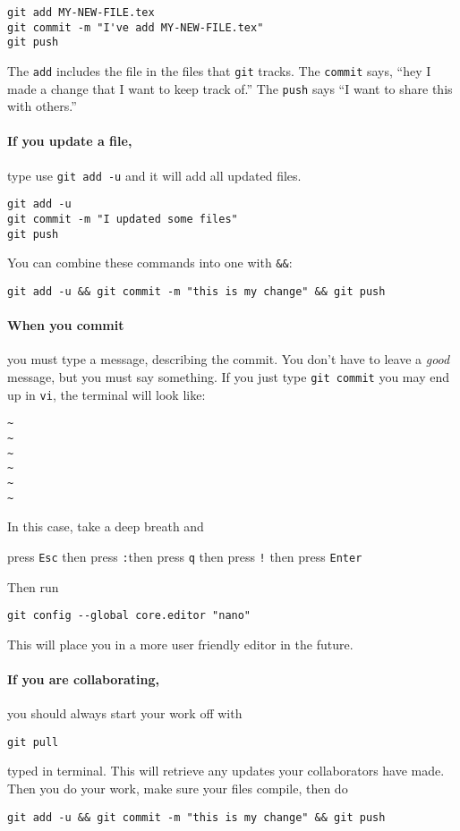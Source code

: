 \documentclass{ximera}
\begin{document}
\begin{verbatim}
git add MY-NEW-FILE.tex
git commit -m "I've add MY-NEW-FILE.tex"
git push
\end{verbatim}
The \verb!add! includes the file in the files that \verb!git! tracks. The
\verb!commit! says, ``hey I made a change that I want to keep track of.'' The
\verb!push! says ``I want to share this with others.''

\paragraph{If you update a file,}
type use \verb!git add -u! and it will add all updated files.
\begin{verbatim}
git add -u
git commit -m "I updated some files"
git push
\end{verbatim}
You can combine these commands into one with \verb!&&!:
\begin{verbatim}
git add -u && git commit -m "this is my change" && git push
\end{verbatim}

\paragraph{When you commit} you must type a message, describing the commit. You
don't have to leave a \textit{good} message, but you must say something.
If you just type \verb!git commit! you may end up in \verb!vi!, the terminal
will look like:
\begin{verbatim}
~
~
~
~
~
~
\end{verbatim}
In this case, take a deep breath and
\begin{center}
      press \verb!Esc! \quad then press \verb!:!\quad then press \verb!q! \quad
      then
      press \verb#!# \quad then press \verb!Enter!
\end{center}
Then run
\begin{verbatim}
git config --global core.editor "nano"
\end{verbatim}
This will place you in a more user friendly editor in the future.

\paragraph{If you are collaborating,} you should always start your work off
with
\begin{verbatim}
git pull
\end{verbatim}
typed in terminal. This will retrieve any updates your collaborators have made.
Then you do your work, make sure your files compile, then do
\begin{verbatim}
git add -u && git commit -m "this is my change" && git push
\end{verbatim}
\end{document}

